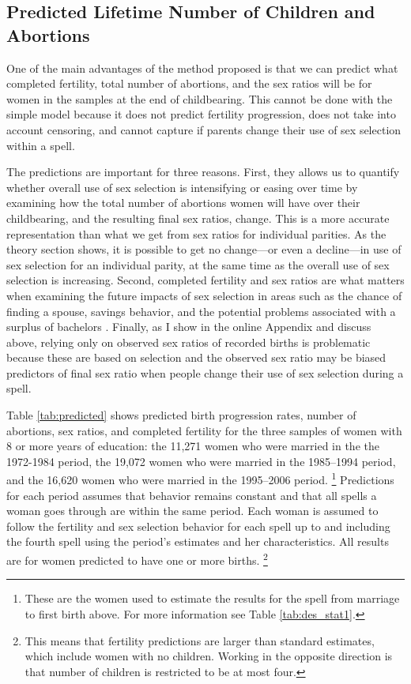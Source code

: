 \documentclass[12pt,letterpaper]{article}
\begin{document}
\subsection{Predicted Lifetime Number of Children and Abortions}

One of the main advantages of the method proposed is that we can predict what 
completed fertility, total number of abortions, and the sex ratios will be for 
women in the samples at the end of childbearing. 
This cannot be done with the simple model because it does not predict fertility
progression, does not take into account censoring, and cannot capture if parents
change their use of sex selection within a spell.

The predictions are important for three reasons.
First, they allows us to quantify whether overall use of sex selection is 
intensifying or easing over time by examining how the total number of abortions 
women will have over their childbearing, and the resulting final sex ratios, change.
This is a more accurate representation than what we get from sex ratios 
for individual parities.
As the theory section shows, it is possible to get no change---or even a 
decline---in use of sex selection for an individual parity, at the same time 
as the overall use of sex selection is increasing.
Second, completed fertility and sex ratios are what matters when examining the future 
impacts of sex selection in areas such as the chance of finding a spouse, savings 
behavior, and the potential problems associated with a surplus of bachelors 
\citep{lancaster02,Ding2009,Wei2009,Edlund2013}.
Finally, as I show in the online Appendix and discuss above, relying only on observed 
sex ratios of recorded births is problematic because these are based on selection and 
the observed sex ratio may be biased predictors of final sex ratio when people change 
their use of sex selection during a spell.

Table \ref{tab:predicted} shows predicted birth progression rates, number of abortions, 
sex ratios, and completed fertility for the three samples of women with 8 or more years 
of education:  
the 11,271 women who were married in the the 1972-1984 period,
the 19,072 women who were married in the 1985--1994 period,
and the 16,620 women who were married in the 1995--2006 period.%
\footnote{
These are the women used to estimate the results for the spell from marriage to first 
birth above.
For more information see Table \ref{tab:des_stat1}.
}
Predictions for each period assumes that behavior remains constant and that all spells 
a woman goes through are within the same period. 
Each woman is assumed to follow the fertility and sex selection behavior for 
each spell up to and including the fourth spell using the period's estimates and her 
characteristics. 
All results are for women predicted to have one or more births.%
\footnote{
This means that fertility predictions are larger than standard estimates, which include
women with no children.
Working in the opposite direction is that number of children is restricted to be at most 
four.
}
\end{document}
